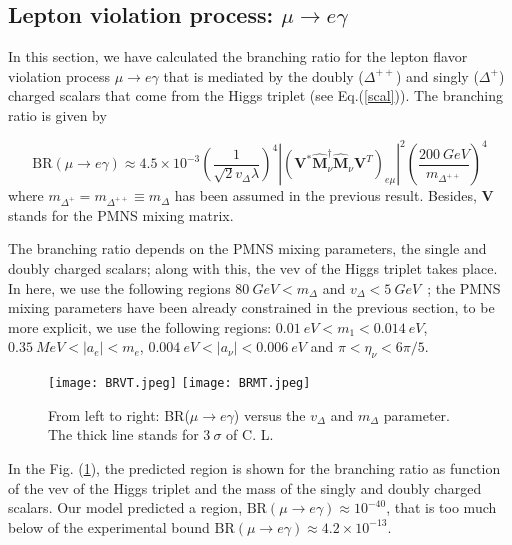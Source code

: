 \documentclass[aps,prd,groupaddress,floatfix,tighten,nofootinbib,showpacs,amsfonts,superscriptaddress]{revtex4-2}
\begin{document}
\subsection{Lepton violation process: $\mu\rightarrow e \gamma$}

In this section, we have calculated the branching ratio for the lepton flavor violation process $\mu\rightarrow e \gamma$ \cite{Akeroyd:2009nu, Lindner:2016bgg} that is mediated by the doubly ($\Delta^{++}$) and singly ($\Delta^{+}$) charged scalars that come from the Higgs triplet (see Eq.(\ref{scal})). The branching ratio \cite{Akeroyd:2009nu} is given by 

\begin{equation}
\textrm{BR}(\mu\rightarrow e \gamma)\approx 4.5\times 10^{-3}\left(\frac{1}{\sqrt{2}v_{\Delta}\lambda}\right)^{4}\left| \left( \mathbf{V}^{\ast}\hat{\mathbf{M}}^{\dagger}_{\nu}\hat{\mathbf{M}}_{\nu} \mathbf{V}^{T}\right)_{e\mu}\right|^{2}\left(\frac{200~GeV}{m_{\Delta^{++}}}\right)^{4}
\end{equation}
where $m_{\Delta^{+}}=m_{\Delta^{++}}\equiv m_{\Delta}$ has been assumed in the previous result. Besides, $\mathbf{V}$ stands for the PMNS mixing matrix.

The branching ratio depends on the PMNS mixing parameters, the single and doubly charged scalars; along with this, the vev of the Higgs triplet takes place. In here, we use the following regions $80~GeV< m_{\Delta}$ and $v_{\Delta}<5~GeV$~\cite{CarcamoHernandez:2018djj}; the PMNS mixing parameters have been already constrained in the previous section, to be more explicit, we use the following regions: $0.01~eV<m_{1}<0.014~eV$, $0.35~MeV<\vert a_{e}\vert<m_{e}$, $0.004~eV<\vert a_{\nu}\vert<0.006~eV$ and $\pi< \eta_{\nu}<6\pi/5$. 


\begin{figure}[h!]\centering
	\texttt{[image: BRVT.jpeg]}
	\hspace{10mm}\texttt{[image: BRMT.jpeg]}
	\caption{From left to right: BR($\mu\rightarrow e\gamma$) versus the $v_{\Delta}$ and $m_{\Delta}$ parameter. The thick line stands for $3~\sigma$ of C. L.}\label{f6}
\end{figure}

In the Fig. (\ref{f6}), the predicted region is shown
for the branching ratio as function of the vev of the Higgs triplet and the mass of the singly and doubly charged scalars. Our model predicted a region, $\textrm{BR}(\mu \rightarrow e\gamma)\approx 10^{-40}$, that is too much below of the experimental bound $\textrm{BR}(\mu \rightarrow e\gamma)\approx 4.2\times10^{-13}$.
\end{document}
